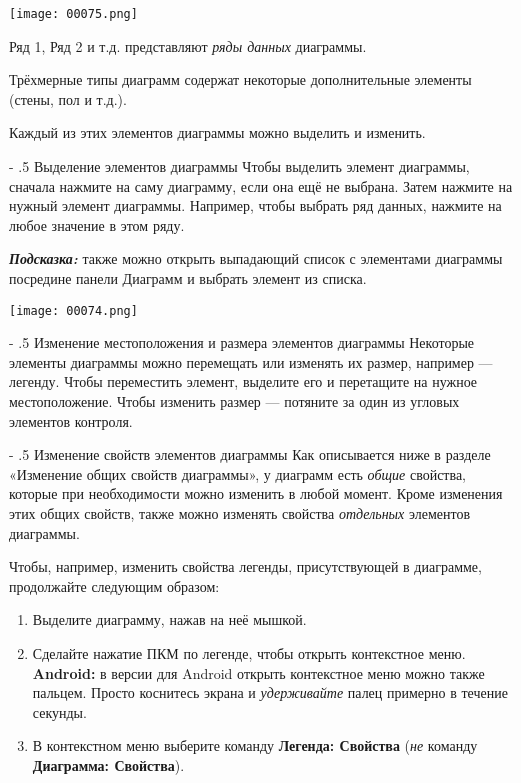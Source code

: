 ﻿\documentclass[a4paper,10pt]{article}
\makeatletter
\renewcommand\paragraph{%
   \@startsection{paragraph}{4}{0mm}%
      {-\baselineskip}%
      {.5\baselineskip}%
      {\normalfont\normalsize\bfseries}}
\makeatother
\begin{document}
\texttt{[image: 00075.png]}

Ряд 1, Ряд 2 и т.д. представляют \textit{ряды данных} диаграммы.

Трёхмерные типы диаграмм содержат некоторые дополнительные элементы (стены, пол и т.д.).

Каждый из этих элементов диаграммы можно выделить и изменить.

\paragraph{Выделение элементов диаграммы}
Чтобы выделить элемент диаграммы, сначала нажмите на саму диаграмму, если она ещё не выбрана. Затем нажмите на нужный элемент диаграммы. Например, чтобы выбрать ряд данных, нажмите на любое значение в этом ряду.

\begin{mdframed}[backgroundcolor=blue!10]
\textbf{\textit{Подсказка:}} также можно открыть выпадающий список с элементами диаграммы посредине панели Диаграмм и выбрать элемент из списка.
\end{mdframed}

\texttt{[image: 00074.png]}

\paragraph{Изменение местоположения и размера элементов диаграммы}
Некоторые элементы диаграммы можно перемещать или изменять их размер, например — легенду. Чтобы переместить элемент, выделите его и перетащите на нужное местоположение. Чтобы изменить размер — потяните за один из угловых элементов контроля.

\paragraph{Изменение свойств элементов диаграммы}
Как описывается ниже в разделе «Изменение общих свойств диаграммы», у диаграмм есть \textit{общие} свойства, которые при необходимости можно изменить в любой момент. Кроме изменения этих общих свойств, также можно изменять свойства \textit{отдельных} элементов диаграммы.

Чтобы, например, изменить свойства легенды, присутствующей в диаграмме, продолжайте следующим образом:

\begin{enumerate}
 \item Выделите диаграмму, нажав на неё мышкой.
 \item Сделайте нажатие ПКМ по легенде, чтобы открыть контекстное меню.\\
 \textbf{Android:} в версии для Android открыть контекстное меню можно также пальцем. Просто коснитесь экрана и \textit{удерживайте} палец примерно в течение секунды.
 \item В контекстном меню выберите команду \textbf{Легенда: Свойства} (\textit{не} команду \textbf{Диаграмма: Свойства}).
\end{enumerate}
\end{document}
